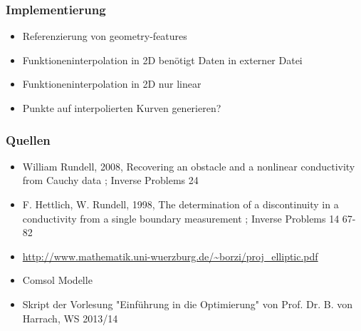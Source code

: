 \documentclass[draft]{beamer}
\begin{document}
\begin{frame}
	\frametitle{Implementierung}
	\begin{itemize}
		\item
			Referenzierung von geometry-features
		\item
			Funktioneninterpolation in 2D benötigt Daten in externer Datei
		\item
			Funktioneninterpolation in 2D nur linear
		\item
			Punkte auf interpolierten Kurven generieren?
	\end{itemize}
\end{frame}

\begin{frame}
	\frametitle{Quellen}
	\begin{itemize}
		\item
	William Rundell, 2008, Recovering an obstacle and a nonlinear conductivity 	from Cauchy data ; Inverse Problems 24
\item
 F. Hettlich, W. Rundell, 1998, The determination of a discontinuity in a conductivity from a single boundary measurement ; Inverse Problems 14 67-82
 \item
	 \url{http://www.mathematik.uni-wuerzburg.de/~borzi/proj_elliptic.pdf}
 \item
 Comsol Modelle
 \item
 Skript der Vorlesung "Einführung in die Optimierung" von Prof. Dr. B. von Harrach, WS 2013/14
	\end{itemize}
\end{frame}
\end{document}
